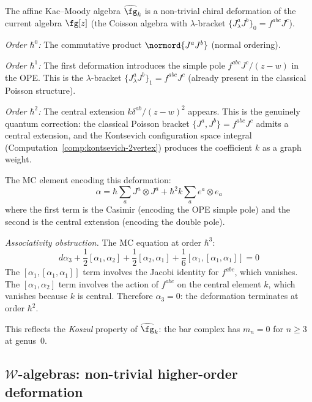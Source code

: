 \begin{computation}
\label{comp:affine-deformation}

The affine Kac--Moody algebra $\widehat{\fg}_k$ is a
non-trivial chiral deformation of the current algebra
$\fg[z]$ (the Coisson algebra with $\lambda$-bracket
$\{J^a_\lambda J^b\}_0 = f^{abc}J^c$).

\emph{Order $\hbar^0$:} The commutative product
$\normord{J^a J^b}$ (normal ordering).

\emph{Order $\hbar^1$:}
The first deformation introduces the simple pole
$f^{abc}J^c/(z-w)$ in the OPE. This is the $\lambda$-bracket
$\{J^a_\lambda J^b\}_1 = f^{abc}J^c$ (already present in the
classical Poisson structure).

\emph{Order $\hbar^2$:}
The central extension $k\delta^{ab}/(z-w)^2$ appears.
This is the genuinely quantum correction: the classical
Poisson bracket $\{J^a, J^b\} = f^{abc}J^c$ admits a central
extension, and the Kontsevich configuration space integral
(Computation~\ref{comp:kontsevich-2vertex}) produces the
coefficient $k$ as a graph weight.

The MC element encoding this deformation:
\[
\alpha = \hbar \sum_{a} J^a \otimes J^a
+ \hbar^2 k \sum_a e^a \otimes e_a
\]
where the first term is the Casimir (encoding the OPE simple pole)
and the second is the central extension (encoding the double pole).

\emph{Associativity obstruction.}
The MC equation at order $\hbar^3$:
\[
d\alpha_3 + \frac{1}{2}[\alpha_1, \alpha_2]
+ \frac{1}{2}[\alpha_2, \alpha_1]
+ \frac{1}{6}[\alpha_1, [\alpha_1, \alpha_1]] = 0
\]
The $[\alpha_1, [\alpha_1, \alpha_1]]$ term involves the Jacobi
identity for $f^{abc}$, which vanishes. The $[\alpha_1, \alpha_2]$
term involves the action of $f^{abc}$ on the central element $k$,
which vanishes because $k$ is central. Therefore $\alpha_3 = 0$:
the deformation terminates at order $\hbar^2$.

This reflects the \emph{Koszul} property of $\widehat{\fg}_k$:
the bar complex has $m_n = 0$ for $n \geq 3$ at genus~0.
\end{computation}

\subsection{$\mathcal{W}$-algebras: non-trivial higher-order deformation}

